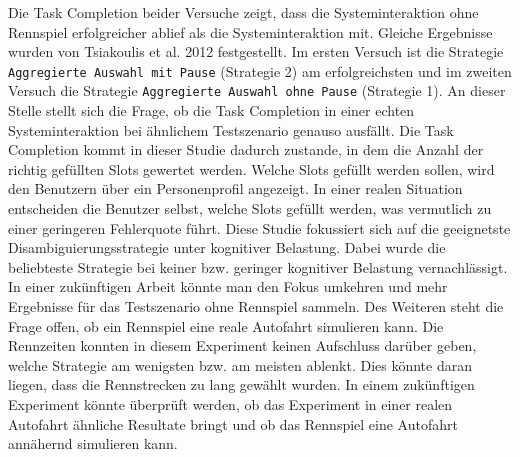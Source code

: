 \documentclass[12pt,a4paper]{scrartcl}
\begin{document}
Die Task Completion beider Versuche zeigt, dass die Systeminteraktion ohne Rennspiel erfolgreicher ablief als die Systeminteraktion mit. Gleiche Ergebnisse wurden von Tsiakoulis et al. 2012 festgestellt. Im ersten Versuch ist die Strategie \texttt{Aggregierte Auswahl mit Pause} (Strategie 2) am erfolgreichsten und im zweiten Versuch die Strategie \texttt{Aggregierte Auswahl ohne Pause} (Strategie 1). An dieser Stelle stellt sich die Frage, ob die Task Completion in einer echten Systeminteraktion bei ähnlichem Testszenario genauso ausfällt. Die Task Completion kommt in dieser Studie dadurch zustande, in dem die Anzahl der richtig gefüllten Slots gewertet werden. Welche Slots gefüllt werden sollen, wird den Benutzern über ein Personenprofil angezeigt. In einer realen Situation entscheiden die Benutzer selbst, welche Slots gefüllt werden, was vermutlich zu einer geringeren Fehlerquote führt. 
\newline
\newline
Diese Studie fokussiert sich auf die geeignetste Disambiguierungsstrategie unter kognitiver Belastung. Dabei wurde die beliebteste Strategie bei keiner bzw. geringer kognitiver Belastung vernachlässigt. In einer zukünftigen Arbeit könnte man den Fokus umkehren und mehr Ergebnisse für das Testszenario ohne Rennspiel sammeln. 
Des Weiteren steht die Frage offen, ob ein Rennspiel eine reale Autofahrt simulieren kann. Die Rennzeiten konnten in diesem Experiment keinen Aufschluss darüber geben, welche Strategie am wenigsten bzw. am meisten ablenkt. Dies könnte daran liegen, dass die Rennstrecken zu lang gewählt wurden. In einem zukünftigen Experiment könnte überprüft werden, ob das Experiment in einer realen Autofahrt ähnliche Resultate bringt und ob das Rennspiel eine Autofahrt annähernd simulieren kann.
\end{document}
